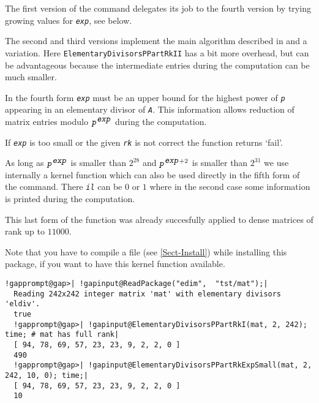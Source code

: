 \documentclass[a4paper,11pt]{report}
\begin{document}
{{{ The first version of the command delegates its job to the fourth version by
trying growing values for \mbox{\texttt{\mdseries\slshape exp}}, see below. 

 The second and third versions implement the main algorithm described in \cite{L98} and a variation. Here \texttt{ElementaryDivisorsPPartRkII} has a bit more overhead, but can be advantageous because the intermediate
entries during the computation can be much smaller.

 In the fourth form \mbox{\texttt{\mdseries\slshape exp}} must be an upper bound for the highest power of \mbox{\texttt{\mdseries\slshape p}} appearing in an elementary divisor of \mbox{\texttt{\mdseries\slshape A}}. This information allows reduction of matrix entries modulo $\mbox{\texttt{\mdseries\slshape p}}^{\mbox{\texttt{\mdseries\slshape exp}}}$ during the computation. 

 If \mbox{\texttt{\mdseries\slshape exp}} is too small or the given \mbox{\texttt{\mdseries\slshape rk}} is not correct the function returns `fail'. 

 As long as $\mbox{\texttt{\mdseries\slshape p}}^{\mbox{\texttt{\mdseries\slshape exp}}}$ is smaller than $2^{28}$ and $\mbox{\texttt{\mdseries\slshape p}}^{\mbox{\texttt{\mdseries\slshape exp}} + 2}$ is smaller than $2^{31}$ we use internally a kernel function which can also be used directly in the
fifth form of the command. There \mbox{\texttt{\mdseries\slshape il}} can be $0$ or $1$ where in the second case some information is printed during the computation.

 This last form of the function was already succesfully applied to dense
matrices of rank up to $11000$.

 Note that you have to compile a file (see \ref{Sect-Install}) while installing this package, if you want to have this kernel function
available.

 
\begin{Verbatim}[commandchars=!@|,fontsize=\small,frame=single,label=Example]
  !gapprompt@gap>| !gapinput@ReadPackage("edim",  "tst/mat");|
  Reading 242x242 integer matrix 'mat' with elementary divisors 'eldiv'.
  true
  !gapprompt@gap>| !gapinput@ElementaryDivisorsPPartRkI(mat, 2, 242); time; # mat has full rank|
  [ 94, 78, 69, 57, 23, 23, 9, 2, 2, 0 ]
  490
  !gapprompt@gap>| !gapinput@ElementaryDivisorsPPartRkExpSmall(mat, 2, 242, 10, 0); time;|
  [ 94, 78, 69, 57, 23, 23, 9, 2, 2, 0 ]
  10
\end{Verbatim}
 }

  

}}
\end{document}
